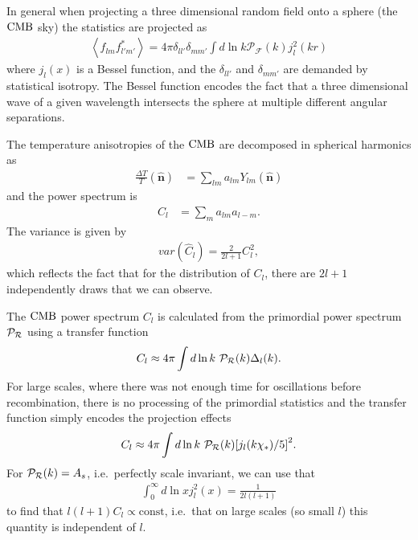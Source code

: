    In general when projecting a three dimensional random field onto a sphere (the $\text{CMB}$ sky)
    the statistics are projected as
    \begin{align}
        \left<f_{lm}f^*_{l'm'}\right> = 4\pi \delta_{ll'}\delta_{mm'}
        \int d\ln k \mathcal{P}_{\mathcal{F}}(k) j_l^2(kr)
    \end{align}
    where $j_l(x)$ is a Bessel function, and the $\delta_{ll'}$ and $\delta_{mm'}$
    are demanded by statistical isotropy. The Bessel function encodes the fact that a three dimensional
    wave of a given wavelength intersects the sphere at multiple different angular separations.


    The temperature anisotropies of the $\text{CMB}$ are decomposed in spherical
    harmonics as
    \begin{align}
        \frac{\Delta T}{T}(\hat{\mathbf{n}}) &= \sum_{lm} a_{lm}Y_{lm}(\hat{\mathbf{n}})
    \end{align}
    and the power spectrum is
    \begin{align}
        C_l &= \sum_m a_{lm} a_{l-m}.
    \end{align}
    The variance is given by
    \begin{align}
        var\left(\hat{C}_l\right) = \frac{2}{2l+1} C^2_l,
    \end{align}
    which reflects the fact that for the distribution of $C_l$,
    there are $2l+1$ independently draws that we can observe.

    The $\text{CMB}$ power spectrum $C_l$ is calculated from the primordial power spectrum $\mathcal{P}_{\mathcal{R}}$
    using a transfer function
    \begin{align}\label{eqn:transfer_function}
        C_l \approx 4\pi\int d\ln k~\mathcal{P}_{\mathcal{R}}(k)
            \Delta_l(k).
    \end{align}
    For large scales, where there was not enough time for oscillations
    before recombination, there is no processing of the primordial statistics
    and the transfer function simply encodes the projection effects
    \begin{align}
        C_l \approx 4\pi\int d\ln k~\mathcal{P}_{\mathcal{R}}(k){\left[
            j_l(k\chi_*)/5
            \right]}^2.
    \end{align}
    For $\mathcal{P}_{\mathcal{R}}(k)=A_s$, i.e.\ perfectly scale invariant,
    we can use that
    \begin{align}
        \int_0^{\infty}d\ln x j_l^2(x) = \frac{1}{2l(l+1)}
    \end{align}
    to find that $l(l+1)C_l\propto \text{const}$, i.e.\ that on large scales
    (so small $l$) this quantity is independent of $l$.


